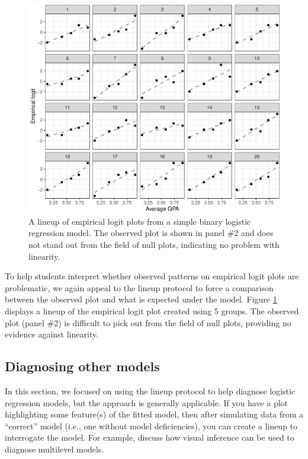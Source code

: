 \documentclass[12pt]{article}
\begin{document}
\begin{figure}
\centering
\includegraphics{vizinf-paper_files/figure-latex/unnamed-chunk-8-1.pdf}
\caption{\label{fig:emplogitlineup} A lineup of empirical logit plots
from a simple binary logistic regression model. The observed plot is
shown in panel \#2 and does not stand out from the field of null plots,
indicating no problem with linearity.}
\end{figure}

To help students interpret whether observed patterns on empirical logit
plots are problematic, we again appeal to the lineup protocol to force a
comparison between the observed plot and what is expected under the
model. Figure \ref{fig:emplogitlineup} displays a lineup of the
empirical logit plot created using 5 groups. The observed plot (panel
\#2) is difficult to pick out from the field of null plots, providing no
evidence against linearity.

\hypertarget{diagnosing-other-models}{%
\subsection{Diagnosing other models}\label{diagnosing-other-models}}

In this section, we focused on using the lineup protocol to help
diagnose logistic regression models, but the approach is generally
applicable. If you have a plot highlighting some feature(s) of the
fitted model, then after simulating data from a ``correct'' model (i.e.,
one without model deficiencies), you can create a lineup to interrogate
the model. For example, \cite{Loy2017-fo} discuss how visual inference
can be used to diagnose multilevel models.
\end{document}
